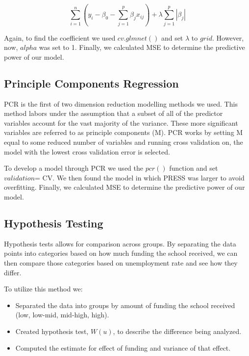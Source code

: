 \documentclass{article}
\begin{document}
\begin{equation}
\sum_{i=1}^{n}(y_i-\beta_0-\sum_{j=1}^{p}\beta_jx_{ij}) + \lambda\sum_{j=1}^{p}|\beta_{j}|
\end{equation}

Again, to find the coefficient we used $cv.glmnet()$ and set $\lambda$ to $grid$. However, now, $alpha$ was set to 1. Finally, we calculated MSE to determine the predictive power of our model.

\subsection{Principle Components Regression}

PCR is the first of two dimension reduction modelling methods we used.  This method labors under the assumption that a subset of all of the predictor variables account for the vast majority of the variance.  These more significant variables are referred to as principle components (M).  PCR works by setting M equal to some reduced number of variables and running cross validation on, the model with the lowest cross validation error is selected.

To develop a model through PCR we used the $pcr()$ function and set $validation$= CV.  We then found the model in which PRESS was larger to avoid overfitting. Finally, we calculated MSE to determine the predictive power of our model.

\subsection{Hypothesis Testing}

Hypothesis tests allows for comparison across groups. By separating the data points into categories based on how much funding the school received, we can then compare those categories based on unemployment rate and see how they differ.


To utilize this method we:
\begin{itemize}
\item Separated the data into groups by amount of funding the school received (low, low-mid, mid-high, high). 
\item Created hypothesis test, $W(u)$, to describe the difference being analyzed.
\item Computed the estimate for effect of funding and variance of that effect.
\end{itemize}
\end{document}
